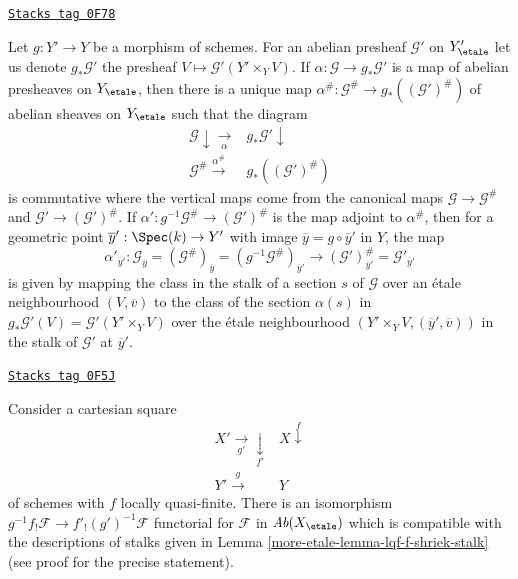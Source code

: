 \begin{remark}
\label{more-etale-remark-construct-map-presheaves-downstairs}
\href{https://stacks.math.columbia.edu/tag/0F78}{\texttt{Stacks tag 0F78}}

Let $g : Y' \to Y$ be a morphism of schemes.
For an abelian presheaf $\mathcal{G}'$ on $Y'_\etale$ let us denote
$g_*\mathcal{G}'$ the presheaf $V \mapsto \mathcal{G}'(Y' \times_Y V)$.
If $\alpha : \mathcal{G} \to g_*\mathcal{G}'$ is a map of abelian presheaves
on $Y_\etale$, then there is a unique map
$\alpha^\# : \mathcal{G}^\# \to g_*((\mathcal{G}')^\#)$
of abelian sheaves on $Y_\etale$ such that the diagram
$$
\begin{array}{cc}\mathcal{G} \downarrow\underset{\alpha}{\longrightarrow} & g_*\mathcal{G}' \downarrow \\ \mathcal{G}^\# \overset{\alpha^\#}{\longrightarrow} & g_*((\mathcal{G}')^\#)\end{array}
$$
is commutative where the vertical maps come from the canonical maps
$\mathcal{G} \to \mathcal{G}^\#$ and $\mathcal{G}' \to (\mathcal{G}')^\#$. If
$\alpha' : g^{-1}\mathcal{G}^\# \to (\mathcal{G}')^\#$
is the map adjoint to $\alpha^\#$, then for a geometric point
$\overline{y}' : \Spec(k) \to Y'$ with image
$\overline{y} = g \circ \overline{y}'$ in $Y$, the map
$$
\alpha'_{\overline{y}'} :
\mathcal{G}_{\overline{y}} =
(\mathcal{G}^\#)_{\overline{y}} =
(g^{-1}\mathcal{G}^\#)_{\overline{y}'}
\longrightarrow
(\mathcal{G}')^\#_{\overline{y}'} =
\mathcal{G}'_{\overline{y}'}
$$
is given by mapping the class in the stalk of a section $s$ of $\mathcal{G}$
over an \'etale neighbourhood $(V, \overline{v})$ to the class of the section
$\alpha(s)$ in $g_*\mathcal{G}'(V) = \mathcal{G}'(Y' \times_Y V)$
over the \'etale neighbourhood $(Y' \times_Y V, (\overline{y}', \overline{v}))$
in the stalk of $\mathcal{G}'$ at $\overline{y}'$.
\end{remark}

\begin{lemma}
\label{more-etale-lemma-lqf-base-change-f-shriek}
\href{https://stacks.math.columbia.edu/tag/0F5J}{\texttt{Stacks tag 0F5J}}

Consider a cartesian square
$$
\begin{array}{cc}X' \underset{g'}{\longrightarrow}\underset{f'}{\downarrow} & X \overset{f}{\downarrow} \\ Y' \overset{g}{\longrightarrow} & Y\end{array}
$$
of schemes with $f$ locally quasi-finite. There is an isomorphism
$g^{-1}f_!\mathcal{F} \to f'_!(g')^{-1}\mathcal{F}$ functorial for
$\mathcal{F}$ in $\textit{Ab}(X_\etale)$ which is compatible with
the descriptions of stalks given in Lemma \ref{more-etale-lemma-lqf-f-shriek-stalk}
(see proof for the precise statement).
\end{lemma}

